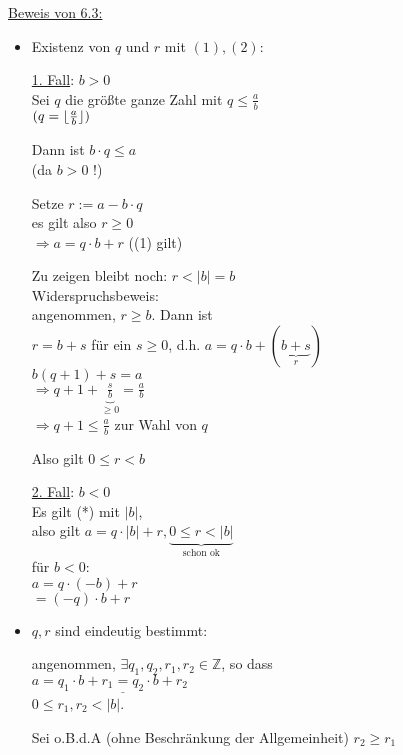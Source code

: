 \documentclass[a4paper, 12pt, twoside] {article}
\DeclarePairedDelimiter\floor{\lfloor}{\rfloor}
\begin{document}
\underline{Beweis von 6.3:}

\begin{itemize}

\item Existenz von $q$ und $r$ mit $(1), (2)$:

\underline{1. Fall}: $b > 0$ \\
Sei $q$ die größte ganze Zahl mit $q \leq \frac{a}{b}$ \\
$(q = \floor{\frac{a}{b}})$

Dann ist $b \cdot q \leq a$ \\
(da $b > 0$ !)

Setze $r:= a - b \cdot q$ \\
es gilt also $r \geq 0$ \\
$\Rightarrow a = q \cdot b +r$ ((1) gilt) %

Zu zeigen bleibt noch: $r < |b| = b$ \\
Widerspruchsbeweis: \\
angenommen, $r \geq b$. Dann ist \\
$r = b+s$ für ein $s \geq 0$,
d.h. $a = q \cdot b + (\underbrace{b+s}_{r})$ \\
$b(q+1)+s = a$ \\
$\Rightarrow q +1 + \underbrace{\frac{s}{b}}_{\geq 0} = \frac{a}{b}$ \\
$\Rightarrow q + 1 \leq \frac{a}{b}$ zur Wahl von $q \quad$ \Lightning

Also gilt $0 \leq r < b$

\underline{2. Fall}: $b < 0$ \\
Es gilt (*) mit $|b|$, \\ %
also gilt $a = q  \cdot  |b| + r, \underbrace{0 \leq r < |b|}_{\text{schon ok}}$ \\
für $b < 0$: \\
$a = q \cdot (-b) + r$ \\
$= (-q)  \cdot  b + r$

\item $q, r$ sind eindeutig bestimmt:

angenommen, $\exists q_1, q_2, r_1, r_2 \in \mathbb{Z}$, so dass \\
$a = \underline{q_1 \cdot  b + r_1 = q_2 \cdot b+r_2}$ \\
$0 \leq r_1, r_2 < |b|$.

Sei o.B.d.A (ohne Beschränkung der Allgemeinheit) $r_2 \geq r_1$


\end{itemize}
\end{document}
